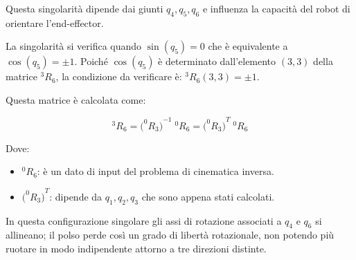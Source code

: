 \documentclass[11pt, a4paper]{article}
\begin{document}
\newpage
{}
\begin{par}
\begin{flushleft}
Questa singolarità dipende dai giunti $q_4 ,q_5 ,q_6$ e influenza la capacità del robot di orientare l'end-effector.
\end{flushleft}
\end{par}

\begin{par}
\begin{flushleft}
La singolarità si verifica quando $\sin (q_5 )=0$ che è equivalente a $\cos (q_5 )=\pm 1$. Poiché $\cos (q_5 )$ è determinato dall'elemento $(3,3)$ della matrice $^3 R_6$, la condizione da verificare è: $^3 R_6 (3,3)=\pm 1$.
\end{flushleft}
\end{par}

\begin{par}
\begin{flushleft}
Questa matrice è calcolata come:
\end{flushleft}
\end{par}

\[
    ^3 R_6 ={\bigl(^0 R_3 \bigr)}^{-1} \;^0 R_6 ={\bigl(^0 R_3 \bigr)}^T \;^0 R_6
\]

\begin{par}
\begin{flushleft}
Dove:
\end{flushleft}
\end{par}

\begin{itemize}

   \item{\begin{flushleft} $^0 R_6$: è un dato di input del problema di cinematica inversa. \end{flushleft}}
   \item{\begin{flushleft} ${\bigl(^0 R_3 \bigr)}^T$: dipende da $q_1 ,q_2 ,q_3$ che sono appena stati calcolati. \end{flushleft}}
\end{itemize}

\begin{par}
\begin{flushleft}
In questa configurazione singolare gli assi di rotazione associati a $q_4$ e $q_6$ si allineano; il polso perde così un grado di libertà rotazionale, non potendo più ruotare in modo indipendente attorno a tre direzioni distinte.
\end{flushleft}
\end{par}
\end{document}

